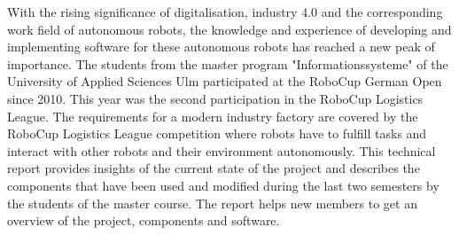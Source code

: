 With the rising significance of digitalisation, industry 4.0 and the corresponding work field of autonomous robots, the knowledge and experience of developing and implementing software for these autonomous robots has reached a new peak of importance. The students from the master program "Informationssysteme" of the University of Applied Sciences Ulm participated at the RoboCup German Open since 2010. This year was the second participation in the RoboCup Logistics League. The requirements for a modern industry factory are covered by the RoboCup Logistics League competition where robots have to fulfill tasks and interact with other robots and their environment autonomously. This technical report provides insights of the current state of the project and describes the components that have been used and modified during the last two semesters by the students of the master course. The report helps new members to get an overview of the project, components and software.